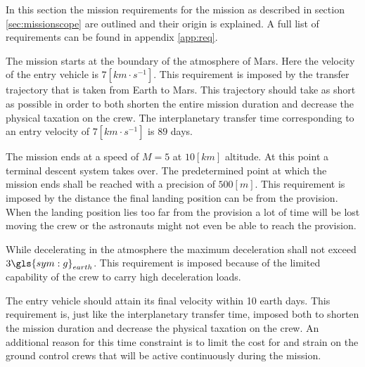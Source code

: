 In this section the mission requirements for the mission as described in section \ref{sec:missionscope} are outlined and their origin is explained. A full list of requirements can be found in appendix \ref{app:req}.

The mission starts at the boundary of the atmosphere of Mars. Here the velocity of the entry vehicle is $7 \left[km \cdot s^{-1} \right]$. This requirement is imposed by the transfer trajectory that is taken from Earth to Mars. This trajectory should take as short as possible in order to both shorten the entire mission duration and decrease the physical taxation on the crew. The interplanetary transfer time corresponding to an entry velocity of $7 \left[km \cdot s^{-1} \right]$ is $89$ days. 

The mission ends at a speed of $M=5$ at $10 \left[km\right]$ altitude. At this point a terminal descent system takes over. The predetermined point at which the mission ends shall be reached with a precision of $500 \left[m\right]$. This requirement is imposed by the distance the final landing position can be from the provision. When the landing position lies too far from the provision a lot of time will be lost moving the crew or the astronauts might not even be able to reach the provision.

While decelerating in the atmosphere the maximum deceleration shall not exceed $3\gls{sym:g}_{earth}$. This requirement is imposed because of the limited capability of the crew to carry high deceleration loads.

The entry vehicle should attain its final velocity within 10 earth days. This requirement is, just like the interplanetary transfer time, imposed both to shorten the mission duration and decrease the physical taxation on the crew. An additional reason for this time constraint is to limit the cost for and strain on the ground control crews that will be active continuously during the mission.